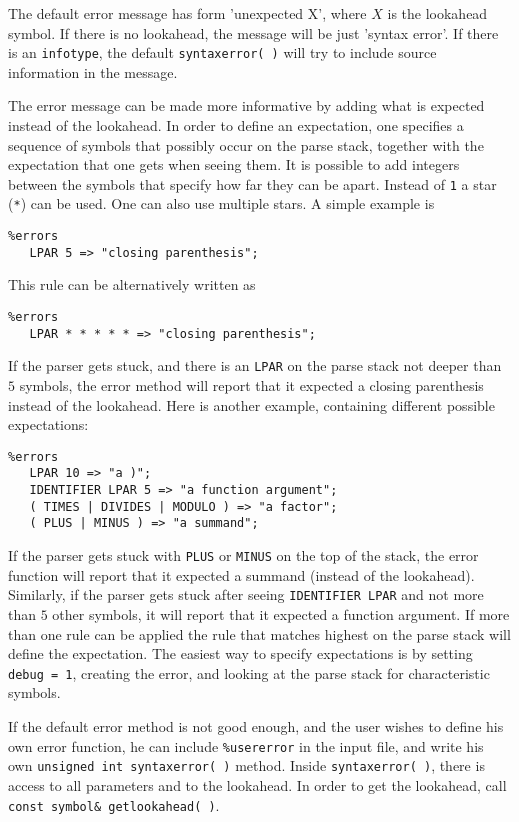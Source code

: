 \documentclass{article}
\begin{document}
The default error message has form
'unexpected X', where $X$ is the lookahead symbol. 
If there is no lookahead, the message will be just
'syntax error'. 
If there is an \verb+infotype+, the default \verb+syntaxerror( )+ will
try to include source information in the message. 

The error message can be made more informative by 
adding what is expected instead of the lookahead.
In order to define an expectation, 
one specifies a sequence of symbols that possibly
occur on the parse stack, together with the expectation 
that one gets when seeing them. 
It is possible to add integers between the symbols 
that specify
how far they can be apart. Instead of \verb+1+ a star
(\verb+*+) can be used. One can also use multiple stars.
A simple example is
\begin{verbatim}
%errors
   LPAR 5 => "closing parenthesis"; \end{verbatim}
This rule can be alternatively written as
\begin{verbatim}
%errors
   LPAR * * * * * => "closing parenthesis"; \end{verbatim}
If the parser gets stuck, and there is an \verb+LPAR+ 
on the parse stack not deeper than $ 5 $ symbols,
the error method will report that it expected
a closing parenthesis instead of the lookahead.
Here is another example, containing different possible
expectations: 
\begin{verbatim}
%errors
   LPAR 10 => "a )";
   IDENTIFIER LPAR 5 => "a function argument";
   ( TIMES | DIVIDES | MODULO ) => "a factor";
   ( PLUS | MINUS ) => "a summand"; \end{verbatim}
If the parser gets stuck with \verb+PLUS+ or \verb+MINUS+ on
the top of the stack, the error function will report that it
expected a summand (instead of the lookahead).
Similarly, if the parser gets stuck after seeing \verb+IDENTIFIER LPAR+ 
and not more than $ 5 $ other symbols, it will report that it
expected a function argument.
If more than one rule can be applied the rule that matches
highest on the parse stack will define the expectation. 
The easiest way to specify expectations is by
setting \verb+debug = 1+, creating the error, and looking
at the parse stack for characteristic symbols.

If the default error method is not good enough, and the user wishes 
to define his own error function, 
he can include \verb+%usererror+ in the input file, 
and write his own 
\verb+unsigned int syntaxerror( )+ method. 
Inside \verb+syntaxerror( )+, there is access
to all parameters and to the lookahead. 
In order to get the lookahead, call \verb+const symbol& getlookahead( )+. 
\end{document}
